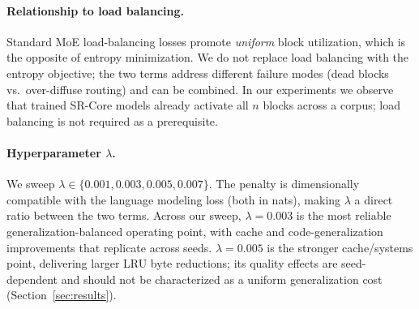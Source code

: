 \paragraph{Relationship to load balancing.}
Standard MoE load-balancing losses \citep{fedus2022switch} promote \emph{uniform} block
utilization, which is the opposite of entropy minimization.
We do not replace load balancing with the entropy objective; the two terms address different
failure modes (dead blocks vs.\ over-diffuse routing) and can be combined.
In our experiments we observe that trained SR-Core models already activate all $n$ blocks
across a corpus; load balancing is not required as a prerequisite.

\paragraph{Hyperparameter $\lambda$.}
We sweep $\lambda \in \{0.001, 0.003, 0.005, 0.007\}$.
The penalty is dimensionally compatible with the language modeling loss (both in nats),
making $\lambda$ a direct ratio between the two terms.
Across our sweep, $\lambda = 0.003$ is the most reliable generalization-balanced operating
point, with cache and code-generalization improvements that replicate across seeds.
$\lambda = 0.005$ is the stronger cache/systems point, delivering larger LRU byte
reductions; its quality effects are seed-dependent and should not be characterized as a
uniform generalization cost (Section~\ref{sec:results}).
